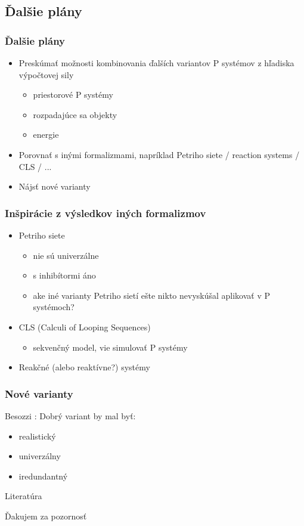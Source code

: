 \documentclass{beamer}
\begin{document}

\subsection{Ďalšie plány} %
\label{sub:dalsie_plany}

\begin{frame}[t]\frametitle{Ďalšie plány}
\begin{itemize}
  \item Preskúmať možnosti kombinovania ďalších variantov P systémov z hľadiska výpočtovej sily
  \begin{itemize}
    \item priestorové P systémy
    \item rozpadajúce sa objekty
    \item energie
  \end{itemize}
  \item Porovnať s inými formalizmami, napríklad Petriho siete / reaction systems / CLS / ...
  \item Nájsť nové varianty
\end{itemize}
\end{frame}


\begin{frame}[t]\frametitle{Inšpirácie z výsledkov iných formalizmov}
\begin{itemize}
  \item Petriho siete
  \begin{itemize}
    \item nie sú univerzálne
    \item s inhibítormi áno
    \item ake iné varianty Petriho sietí ešte nikto nevyskúšal aplikovať v P systémoch?
  \end{itemize}
  \item CLS (Calculi of Looping Sequences)
  \begin{itemize}
    \item sekvenčný model, vie simulovať P systémy \cite{Barbuti07CLS}
  \end{itemize}
  \item Reakčné (alebo reaktívne?) systémy
\end{itemize}
\end{frame}

\begin{frame}[t]\frametitle{Nové varianty}
Besozzi \cite{Besozzi:PhD:2004}: Dobrý variant by mal byť:
\begin{itemize}
  \item realistický
  \item univerzálny
  \item iredundantný
\end{itemize}
\end{frame}



\begin{frame}[allowframebreaks]{Literatúra}


\end{frame}

\begin{frame}[plain]
\begin{center}
  Ďakujem za pozornosť
\end{center}
\end{frame}
\end{document}
